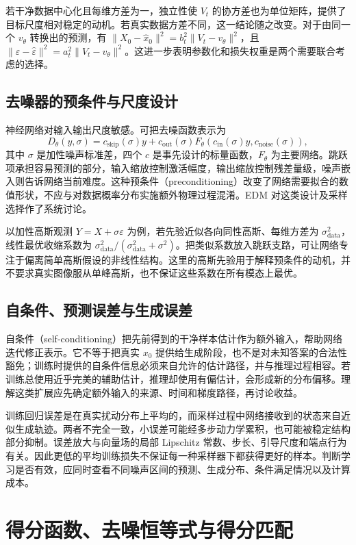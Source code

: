 \documentclass[UTF8,12pt,a4paper,fontset=fandol]{ctexart}
\begin{document}
若干净数据中心化且每维方差为一，独立性使 $V_t$ 的协方差也为单位矩阵，提供了目标尺度相对稳定的动机。若真实数据方差不同，这一结论随之改变。对于由同一个 $v_\theta$ 转换出的预测，有 $\|X_0-\widehat x_0\|^2=b_t^2\|V_t-v_\theta\|^2$，且 $\|\varepsilon-\widehat\varepsilon\|^2=a_t^2\|V_t-v_\theta\|^2$。这进一步表明参数化和损失权重是两个需要联合考虑的选择。

\subsection{去噪器的预条件与尺度设计}
神经网络对输入输出尺度敏感。可把去噪函数表示为
\[
 D_\theta(y,\sigma)=c_{\mathrm{skip}}(\sigma)y+
 c_{\mathrm{out}}(\sigma)F_\theta(c_{\mathrm{in}}(\sigma)y,c_{\mathrm{noise}}(\sigma)),
\]
其中 $\sigma$ 是加性噪声标准差，四个 $c$ 是事先设计的标量函数，$F_\theta$ 为主要网络。跳跃项承担容易预测的部分，输入缩放控制激活幅度，输出缩放控制残差量级，噪声嵌入则告诉网络当前难度。这种预条件（preconditioning）改变了网络需要拟合的数值形状，不应与对数据概率分布实施额外物理过程混淆。EDM 对这类设计及采样选择作了系统讨论\cite{karras2022}。

以加性高斯观测 $Y=X+\sigma\varepsilon$ 为例，若先验近似各向同性高斯、每维方差为 $\sigma_{\mathrm{data}}^2$，线性最优收缩系数为 $\sigma_{\mathrm{data}}^2/(\sigma_{\mathrm{data}}^2+\sigma^2)$。把类似系数放入跳跃支路，可让网络专注于偏离简单高斯假设的非线性结构。这里的高斯先验用于解释预条件的动机，并不要求真实图像服从单峰高斯，也不保证这些系数在所有模态上最优。

\subsection{自条件、预测误差与生成误差}
自条件（self-conditioning）把先前得到的干净样本估计作为额外输入，帮助网络迭代修正表示。它不等于把真实 $x_0$ 提供给生成阶段，也不是对未知答案的合法性豁免；训练时提供的自条件信息必须来自允许的估计路径，并与推理过程相容。若训练总使用近乎完美的辅助估计，推理却使用有偏估计，会形成新的分布偏移。理解这类扩展应先确定额外输入的来源、时间和梯度路径，再讨论收益。

训练回归误差是在真实扰动分布上平均的，而采样过程中网络接收到的状态来自近似生成轨迹。两者不完全一致，小误差可能经多步动力学累积，也可能被稳定结构部分抑制。误差放大与向量场的局部 Lipschitz 常数、步长、引导尺度和端点行为有关。因此更低的平均训练损失不保证每一种采样器下都获得更好的样本。判断学习是否有效，应同时查看不同噪声区间的预测、生成分布、条件满足情况以及计算成本。

\section{得分函数、去噪恒等式与得分匹配}
\label{sec:diff-score}
\end{document}
